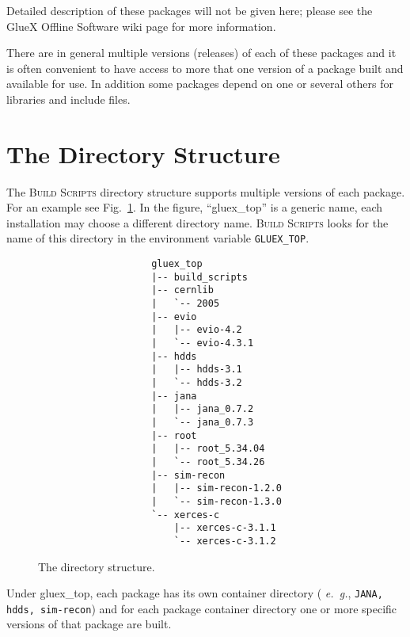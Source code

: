 \documentclass[12pt, letterpaper]{article}
\newcommand{\bs}{\textsc{Build Scripts}}
\begin{document}
\begin{enumerate}

\end{enumerate}

Detailed description of these packages will not be given here; please
see the GlueX Offline Software wiki page for more information.

There are in general multiple versions (releases) of each of these
packages and it is often convenient to have access to more that one
version of a package built and available for use. In addition some
packages depend on one or several others for libraries and include
files.

\section{The Directory Structure}\label{section:directory}

The \bs{} directory structure supports multiple versions of each
package. For an example see Fig.~\ref{fig:directory-tree}. In the
figure, ``gluex\_top'' is a generic name, each installation may choose
a different directory name. \bs{} looks for the name of this directory
in the environment variable {\tt GLUEX\_TOP}.

\begin{figure}
\begin{verbatim}
                    gluex_top
                    |-- build_scripts
                    |-- cernlib
                    |   `-- 2005
                    |-- evio
                    |   |-- evio-4.2
                    |   `-- evio-4.3.1
                    |-- hdds
                    |   |-- hdds-3.1
                    |   `-- hdds-3.2
                    |-- jana
                    |   |-- jana_0.7.2
                    |   `-- jana_0.7.3
                    |-- root
                    |   |-- root_5.34.04
                    |   `-- root_5.34.26
                    |-- sim-recon
                    |   |-- sim-recon-1.2.0
                    |   `-- sim-recon-1.3.0
                    `-- xerces-c
                        |-- xerces-c-3.1.1
                        `-- xerces-c-3.1.2
\end{verbatim}
\caption{The directory structure.}\label{fig:directory-tree}
\end{figure}

Under gluex\_top, each package has its own container directory ({\it
  e.~g.}, {\tt JANA, hdds, sim-recon}) and for each package container
directory one or more specific versions of that package are built.
\end{document}
